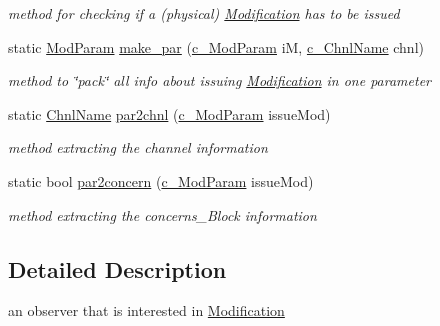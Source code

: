 \begin{DoxyCompactItemize}
\begin{DoxyCompactList}\small\item\em method for checking if a (physical) \mbox{\hyperlink{class_s_m_spp__di__unipi__it_1_1_modification}{Modification}} has to be issued \end{DoxyCompactList}\item 
static \mbox{\hyperlink{group___modification___t_y_p_e_s_gac8fdf1a69f314970b9aaa9328e3f3907}{Mod\+Param}} \mbox{\hyperlink{class_s_m_spp__di__unipi__it_1_1_observer_a2d499ae38e5e95cf66cd71da32b0694a}{make\+\_\+par}} (\mbox{\hyperlink{group___modification___t_y_p_e_s_ga544246d8c462e9a2d817c2c30797968f}{c\+\_\+\+Mod\+Param}} iM, \mbox{\hyperlink{class_s_m_spp__di__unipi__it_1_1_observer_aa9ad8de42ffaf90023bfed5c085ad8bc}{c\+\_\+\+Chnl\+Name}} chnl)
\begin{DoxyCompactList}\small\item\em method to \char`\"{}pack\char`\"{} all info about issuing \mbox{\hyperlink{class_s_m_spp__di__unipi__it_1_1_modification}{Modification}} in one parameter \end{DoxyCompactList}\item 
static \mbox{\hyperlink{class_s_m_spp__di__unipi__it_1_1_observer_a54ce8db639626e45b1f20c289baa989b}{Chnl\+Name}} \mbox{\hyperlink{class_s_m_spp__di__unipi__it_1_1_observer_a7a9f17ec911566406a89c0cd8d61eb2b}{par2chnl}} (\mbox{\hyperlink{group___modification___t_y_p_e_s_ga544246d8c462e9a2d817c2c30797968f}{c\+\_\+\+Mod\+Param}} issue\+Mod)
\begin{DoxyCompactList}\small\item\em method extracting the channel information \end{DoxyCompactList}\item 
static bool \mbox{\hyperlink{class_s_m_spp__di__unipi__it_1_1_observer_afaaba53338fc993962a65c76cd33c65c}{par2concern}} (\mbox{\hyperlink{group___modification___t_y_p_e_s_ga544246d8c462e9a2d817c2c30797968f}{c\+\_\+\+Mod\+Param}} issue\+Mod)
\begin{DoxyCompactList}\small\item\em method extracting the concerns\+\_\+\+Block information \end{DoxyCompactList}\end{DoxyCompactItemize}


\subsection{Detailed Description}
an observer that is interested in \mbox{\hyperlink{class_s_m_spp__di__unipi__it_1_1_modification}{Modification}} 

